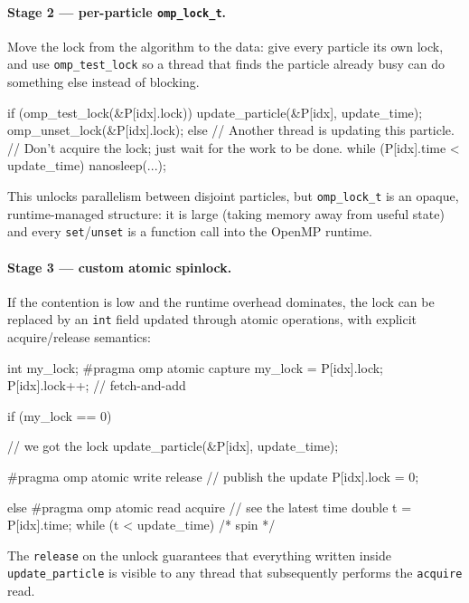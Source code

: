 \paragraph{Stage 2 --- per-particle \texttt{omp\_lock\_t}.} Move the lock from the algorithm to the data: give every particle its own lock, and use \texttt{omp\_test\_lock} so a thread that finds the particle already busy can do something else instead of blocking.

\begin{codeblock}[language = C, morekeywords={pragma}]
if (omp_test_lock(&P[idx].lock)) {
    update_particle(&P[idx], update_time);
    omp_unset_lock(&P[idx].lock);
} else {
    // Another thread is updating this particle.
    // Don't acquire the lock; just wait for the work to be done.
    while (P[idx].time < update_time)
        nanosleep(...);
}
\end{codeblock}

This unlocks parallelism between disjoint particles, but \texttt{omp\_lock\_t} is an opaque, runtime-managed structure: it is large (taking memory away from useful state) and every \texttt{set}/\texttt{unset} is a function call into the OpenMP runtime.

\paragraph{Stage 3 --- custom atomic spinlock.} If the contention is low and the runtime overhead dominates, the lock can be replaced by an \texttt{int} field updated through atomic operations, with explicit acquire/release semantics:

\begin{codeblock}[language = C, morekeywords={pragma}]
int my_lock;
#pragma omp atomic capture
{ my_lock = P[idx].lock; P[idx].lock++; }   // fetch-and-add

if (my_lock == 0) {                         // we got the lock
    update_particle(&P[idx], update_time);

    #pragma omp atomic write release        // publish the update
    P[idx].lock = 0;
} else {
    #pragma omp atomic read acquire         // see the latest time
    double t = P[idx].time;
    while (t < update_time) { /* spin */ }
}
\end{codeblock}

The \texttt{release} on the unlock guarantees that everything written inside \texttt{update\_particle} is visible to any thread that subsequently performs the \texttt{acquire} read.

